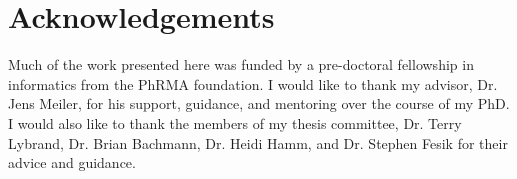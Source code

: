 \chapter*{Acknowledgements}
\vspace{7mm}

Much of the work presented here was funded by a pre-doctoral fellowship in informatics from the PhRMA foundation.
I would like to thank my advisor, Dr. Jens Meiler, for his support, guidance, and mentoring over the course of my PhD. 
I would also like to thank the members of my thesis committee, Dr. Terry Lybrand, Dr. Brian Bachmann, Dr. Heidi Hamm, and Dr. Stephen Fesik for their advice and guidance.



